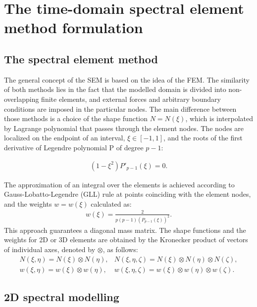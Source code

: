 \documentclass[sensors,article,submit,moreauthors,pdftex]{Definitions/mdpi}
\begin{document}
\section{The time-domain spectral element method formulation}
\label{sec:time_SEM}
\subsection{The spectral element method}
\label{sec:sem}
The general concept of the SEM is based on the idea of the FEM.
The similarity of both methods lies in the fact that the modelled domain is divided into non-overlapping finite elements, and external forces and arbitrary boundary conditions are imposed in the particular nodes.
The main difference between those methods is a choice of the shape function \( N=N(\xi )\), which is interpolated by Lagrange polynomial that passes through the element nodes. The nodes are localized on the endpoint of an interval, \(\xi\in[-1,1]\), and the roots of the first derivative of Legendre polynomial P of degree \(p-1\):

\begin{eqnarray}
(1-\xi^2)P'_{p-1}(\xi)=0.
\label{eq:nodes}
\end{eqnarray}

The approximation of an integral over the elements is achieved according to Gauss-Lobatto-Legendre (GLL) rule at points coinciding with the element nodes, 
and the weights \(w=w(\xi)\) calculated as:
\begin{eqnarray}
{w(\xi)} = \frac{2}{p(p-1)(P_{p-1}(\xi))^2}.
\label{eq:weights}
\end{eqnarray}
This approach guarantees a diagonal mass matrix.
The shape functions and the weights for 2D or 3D elements are obtained by the Kronecker product of vectors of individual axes, denoted by \(\otimes\), as follows:
\begin{eqnarray}
N(\xi,\eta) = N(\xi)\otimes N(\eta), & N(\xi,\eta,\zeta) = N(\xi)\otimes N(\eta)\otimes N(\zeta), \nonumber\\
w(\xi,\eta) = w(\xi)\otimes w(\eta), & w(\xi,\eta,\zeta) = w(\xi)\otimes w(\eta)\otimes w(\zeta).
\label{eq:3Dshape_weights}
\end{eqnarray}
\subsection{2D spectral modelling}
\label{sec:2D_SEM}
\end{document}
